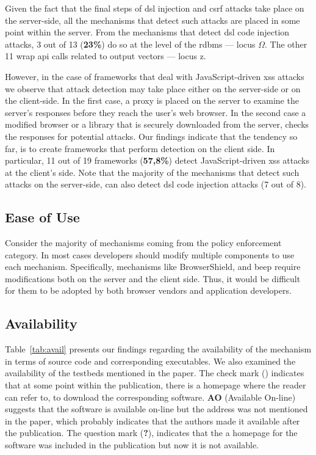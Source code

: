 \documentclass[conference]{IEEEtran}
\newcommand{\tick}{\ding{52}}
\begin{document}
Given the fact that the final steps of
{\sc dsl} injection and {\sc csrf} attacks take place
on the server-side, all the mechanisms that detect
such attacks are placed in some point within the server.
From the mechanisms that detect {\sc dsl} code injection
attacks, 3 out of 13 ({\bf 23\%}) do so at the level
of the {\sc rdbms} --- locus $\Omega$.
The other 11 wrap {\sc api} calls related to output
vectors --- locus {\sc z}.

However, in the case of frameworks that deal
with JavaScript-driven {\sc xss} attacks
we observe that attack detection may take place
either on the server-side or on the client-side.
In the first case, a proxy is placed on the server
to examine the server's responses before they
reach the user's web browser. In the second
case a modified browser or a library that
is securely downloaded from the server,
checks the responses for potential attacks.
Our findings indicate that the tendency so far,
is to create frameworks that perform detection
on the client side. In particular, 11 out of
19 frameworks ({\bf 57,8\%}) detect JavaScript-driven
{\sc xss} attacks at the client's side.
Note that the majority of the mechanisms that
detect such attacks on the server-side, can also
detect {\sc dsl} code injection attacks (7 out of 8). 

\subsection{Ease of Use}

Consider the majority of mechanisms coming from
the policy enforcement category. In most cases
developers should modify multiple components
to use each mechanism. Specifically, mechanisms like
BrowserShield, and {\sc beep} require modifications
both on the server and the client side.
Thus, it would be difficult for them to be adopted by
both browser vendors and application developers.

\subsection{Availability}

Table~\ref{tab:avail} presents our findings regarding the availability
of the mechanism in terms of source code and corresponding
executables. We also examined the availability of the testbeds
mentioned in the paper. The check mark (\tick) indicates that at some
point within the publication, there is a homepage where the reader can
refer to, to download the corresponding software. {\bf AO} (Available
On-line) suggests that the software is available on-line but the
address was not mentioned in the paper, which probably indicates that
the authors made it available after the publication. The question mark
({\bf ?}), indicates that the a homepage for the software was included
in the publication but now it is not available.
\end{document}

